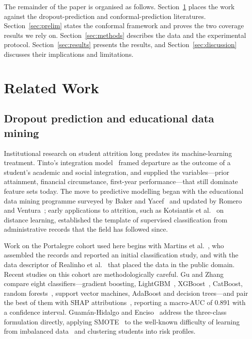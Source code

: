The remainder of the paper is organised as follows.
Section~\ref{sec:related} places the work against the dropout-prediction and
conformal-prediction literatures. Section~\ref{sec:prelim} states the conformal
framework and proves the two coverage results we rely on.
Section~\ref{sec:methods} describes the data and the experimental protocol.
Section~\ref{sec:results} presents the results, and Section~\ref{sec:discussion}
discusses their implications and limitations.

\section{Related Work}\label{sec:related}

\subsection{Dropout prediction and educational data mining}

Institutional research on student attrition long predates its machine-learning
treatment. Tinto's integration model~\cite{tinto1975} framed departure as the
outcome of a student's academic and social integration, and supplied the
variables---prior attainment, financial circumstance, first-year
performance---that still dominate feature sets today. The move to predictive
modelling began with the educational data mining programme surveyed by Baker
and Yacef~\cite{baker2009} and updated by Romero and
Ventura~\cite{romero2020}; early applications to attrition, such as Kotsiantis
et al.~\cite{kotsiantis2003} on distance learning, established the template of
supervised classification from administrative records that the field has
followed since.

Work on the Portalegre cohort used here begins with Martins et
al.~\cite{martins2021}, who assembled the records and reported an initial
classification study, and with the data descriptor of Realinho et
al.~\cite{realinho2022} that placed the data in the public domain. Recent
studies on this cohort are methodologically careful. Gu and Zhang~\cite{gu2026}
compare eight classifiers---gradient boosting, LightGBM~\cite{ke2017},
XGBoost~\cite{chen2016}, CatBoost, random forests~\cite{breiman2001}, support
vector machines, AdaBoost and decision trees---and pair the best of them with
SHAP attributions~\cite{lundberg2017}, reporting a macro-AUC of 0.891 with a
confidence interval. Guam\'an-Hidalgo and Enciso~\cite{guaman2026} address the
three-class formulation directly, applying SMOTE~\cite{chawla2002} to the
well-known difficulty of learning from imbalanced data~\cite{he2009} and
clustering students into risk profiles.

